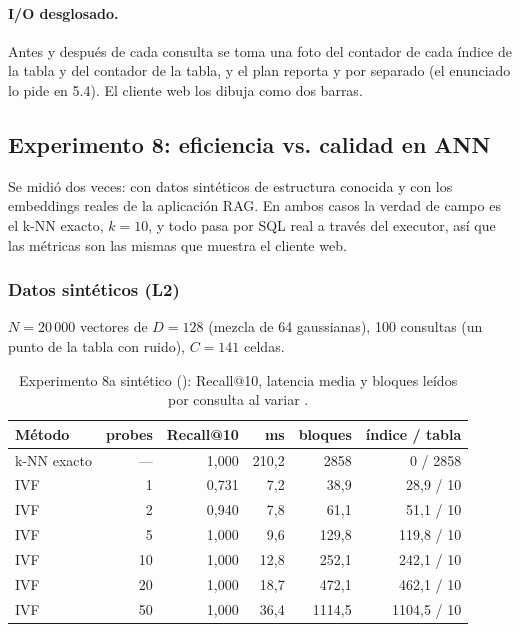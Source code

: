 \paragraph{I/O desglosado.} Antes y después de cada consulta se toma una foto del contador
de cada índice de la tabla y del contador de la tabla, y el plan reporta
 y  por separado (el enunciado lo pide en 5.4). El
cliente web los dibuja como dos barras.

\subsection{Experimento 8: eficiencia vs. calidad en ANN}

Se midió dos veces: con datos sintéticos de estructura conocida y con los embeddings reales
de la aplicación RAG. En ambos casos la verdad de campo es el k-NN exacto, $k=10$, y todo
pasa por SQL real a través del executor, así que las métricas son las mismas que muestra
el cliente web.

\subsubsection{Datos sintéticos (L2)}

$N=20\,000$ vectores de $D=128$ (mezcla de 64 gaussianas), 100 consultas (un punto de la
tabla con ruido), $C=141$ celdas.

\begin{table}[H]
\centering\small
\begin{tabular}{lrrrrr}
\toprule
Método & probes & Recall@10 & ms & bloques & índice / tabla \\
\midrule
k-NN exacto & --- & 1,000 & 210,2 & 2858 & 0 / 2858 \\
IVF & 1 & 0,731 & 7,2 & 38,9 & 28,9 / 10 \\
IVF & 2 & 0,940 & 7,8 & 61,1 & 51,1 / 10 \\
IVF & 5 & 1,000 & 9,6 & 129,8 & 119,8 / 10 \\
IVF & 10 & 1,000 & 12,8 & 252,1 & 242,1 / 10 \\
IVF & 20 & 1,000 & 18,7 & 472,1 & 462,1 / 10 \\
IVF & 50 & 1,000 & 36,4 & 1114,5 & 1104,5 / 10 \\
\bottomrule
\end{tabular}
\caption{Experimento 8a sintético (): Recall@10, latencia media y bloques leídos por consulta al variar .}
\end{table}

